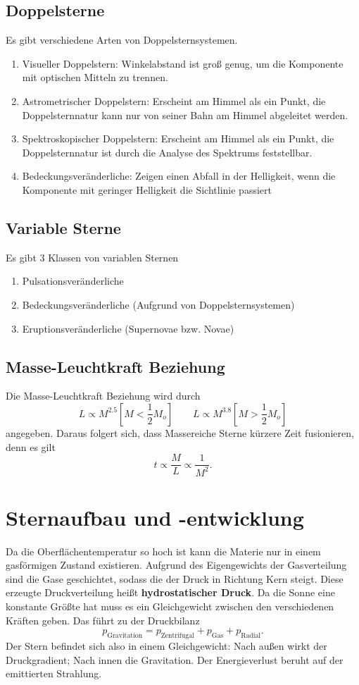 \documentclass[a4paper,12pt]{article}
\begin{document}
\subsection{Doppelsterne}
Es gibt verschiedene Arten von Doppelsternsystemen.
\begin{enumerate}[label=]
        \item Visueller Doppelstern: Winkelabstand ist groß genug, um die Komponente mit optischen Mitteln zu trennen.
        \item Astrometrischer Doppelstern: Erscheint am Himmel als ein Punkt, die Doppelsternnatur kann nur von seiner Bahn am Himmel abgeleitet werden.
        \item Spektroskopischer Doppelstern: Erscheint am Himmel als ein Punkt, die Doppelsternnatur ist durch die Analyse des Spektrums feststellbar.
        \item Bedeckungsveränderliche: Zeigen einen Abfall in der Helligkeit, wenn die Komponente mit geringer Helligkeit die Sichtlinie passiert
\end{enumerate}

\subsection{Variable Sterne}
Es gibt 3 Klassen von variablen Sternen
\begin{enumerate}[label=\arabic*]
        \item Pulsationsveränderliche
        \item Bedeckungsveränderliche (Aufgrund von Doppelsternsystemen)
        \item Eruptionsveränderliche (Supernovae bzw. Novae)
\end{enumerate}

\subsection{Masse-Leuchtkraft Beziehung}
Die Masse-Leuchtkraft Beziehung wird durch 
\[ 
        L\propto M^{2.5}[M<\dfrac{1}{2}M_o]\qquad L\propto M^{3.8}[M>\dfrac{1}{2}M_o]
\] 
angegeben. Daraus folgert sich, dass Massereiche Sterne kürzere Zeit fusionieren, denn es gilt
\[ 
        t\propto \dfrac{M}{L}\propto \dfrac{1}{M^2}
.\] 

\section{Sternaufbau und -entwicklung}
Da die Oberflächentemperatur so hoch ist kann die Materie nur in einem gasförmigen Zustand existieren. Aufgrund des Eigengewichts der Gasverteilung sind die Gase geschichtet, sodass die der Druck in Richtung Kern steigt. Diese erzeugte Druckverteilung heißt \textbf{hydrostatischer Druck}. Da die Sonne eine konstante Größte hat muss es ein Gleichgewicht zwischen den verschiedenen Kräften geben. Das führt zu der Druckbilanz
\[ 
        p_{\text{Gravitation}}=p_{\text{Zentrifugal}}+p_{\text{Gas}}+p_{\text{Radial}}
.\] 
Der Stern befindet sich also in einem Gleichgewicht: Nach außen wirkt der Druckgradient; Nach innen die Gravitation. Der Energieverlust beruht auf der emittierten Strahlung.
\end{document}
